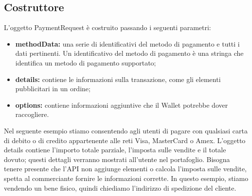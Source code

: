 \documentclass[11pt ,a4paper , twoside , openright ]{article}
\begin{document}
	\subsection{Costruttore}
	L'oggetto PaymentRequest è costruito passando i seguenti parametri:
	\begin{itemize}
	\item \textbf{methodData:} una serie di identificativi del metodo di pagamento e tutti i dati pertinenti. Un identificativo del metodo di pagamento è una stringa che identifica un metodo di pagamento supportato;
	\item \textbf{details:} contiene le informazioni sulla transazione, come gli elementi pubblicitari in un ordine;
	\item \textbf{options:} contiene informazioni aggiuntive che il Wallet potrebbe dover raccogliere.
	\end{itemize}

	Nel seguente esempio stiamo consentendo agli utenti di pagare con qualsiasi carta di debito o di credito appartenente alle reti Visa, MasterCard o Amex. L'oggetto details contiene l'importo totale parziale, l'imposta sulle vendite e il totale dovuto; questi dettagli verranno mostrati all'utente nel portafoglio. Bisogna tenere presente che l'API non aggiunge elementi o calcola l'imposta sulle vendite, spetta al commerciante fornire le informazioni corrette. In questo esempio, stiamo vendendo un bene fisico, quindi chiediamo l'indirizzo di spedizione del cliente.
	
	
\end{document}

